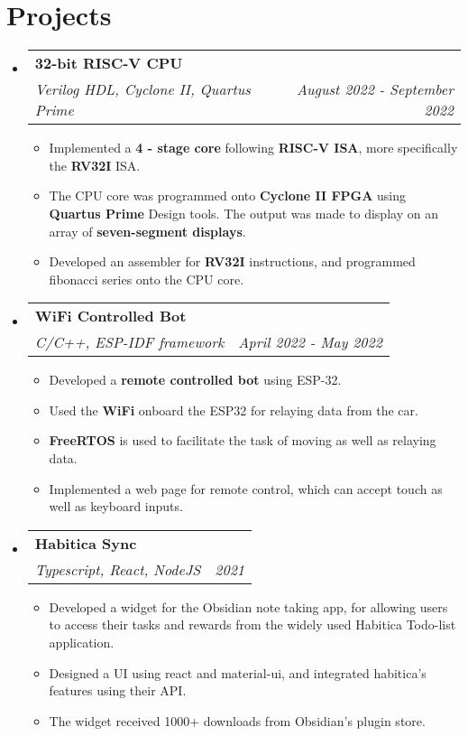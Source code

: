\documentclass[letterpaper,11pt]{article}
\makeatletter
\newcommand{\resumeItem}[1]{
  \item\small{
    {#1 \vspace{-2pt}}
  }
}
\newcommand{\resumeSubheading}[4]{
  \vspace{-2pt}\item
    \begin{tabular*}{1.0\textwidth}[t]{l@{\extracolsep{\fill}}r}
      \textbf{#1} & \textbf{\small #2} \\
      \textit{\small#3} & \textit{\small #4} \\
    \end{tabular*}\vspace{-7pt}
}
\newcommand{\resumeSubHeadingListStart}{\begin{itemize}[leftmargin=0.0in, label={}]}
\newcommand{\resumeSubHeadingListEnd}{\end{itemize}}
\newcommand{\resumeItemListStart}{\begin{itemize}}
\newcommand{\resumeItemListEnd}{\end{itemize}\vspace{-5pt}}
\makeatother
\begin{document}
\section{Projects}
\resumeSubHeadingListStart
\resumeSubheading
{32-bit RISC-V CPU \href{{https://github.com/sra-vjti/synapse32}}{\faExternalLink}}{}
{Verilog HDL, Cyclone II, Quartus Prime}{August 2022 - September 2022}
\resumeItemListStart
\resumeItem{Implemented a \textbf{4 - stage core} following \textbf{RISC-V ISA}, more specifically the \textbf{RV32I} ISA.}
\resumeItem{The CPU core was programmed onto \textbf{Cyclone II FPGA} using \textbf{Quartus Prime} Design tools. The output was made to display on an array of \textbf{seven-segment displays}.}
\resumeItem{Developed an assembler for \textbf{RV32I} instructions, and programmed fibonacci series onto the CPU core.}
\resumeItemListEnd

\resumeSubheading
{WiFi Controlled Bot \href{{https://github.com/SuperChamp234/wifi-bot-sra}}{\faExternalLink}}{}
{C/C++, ESP-IDF framework}{April 2022 - May 2022}
\resumeItemListStart
\resumeItem{Developed a \textbf{remote controlled bot} using ESP-32.}
\resumeItem{Used the \textbf{WiFi} onboard the ESP32 for relaying data from the car.}
\resumeItem{\textbf{FreeRTOS} is used to facilitate the task of moving as well as relaying data.}
\resumeItem{Implemented a web page for remote control, which can accept touch as well as keyboard inputs.}
\resumeItemListEnd
\resumeSubheading
{Habitica Sync
  \href{https://github.com/SuperChamp234/Habitica-sync}{\faExternalLink}}{}
{Typescript, React, NodeJS}{2021}
\resumeItemListStart
\resumeItem{Developed a widget for the Obsidian note taking app, for allowing users to access their tasks and rewards from the widely used Habitica Todo-list application.}
\resumeItem{Designed a UI using react and material-ui, and integrated habitica's features using their API.}
\resumeItem{The widget received 1000+ downloads from Obsidian's plugin store.}
\resumeItemListEnd
{}
\resumeSubHeadingListEnd
\end{document}
